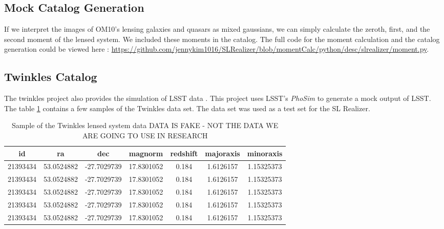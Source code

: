 \documentclass[\docopts]{\docclass}
\begin{document}
\subsection{Mock Catalog Generation}
\label{subsection:MCG}

If we interpret the images of OM10's lensing galaxies and quasars as mixed gaussians, we can simply calculate the zeroth, first, and the second moment of the lensed system. We included these moments in the catalog. The full code for the moment calculation and the catalog generation could be viewed here : \url{https://github.com/jennykim1016/SLRealizer/blob/momentCalc/python/desc/slrealizer/moment.py}.

\subsection{Twinkles Catalog}

The twinkles project also provides the simulation of LSST data \cite{Twinkles}. This project uses LSST's \textit{PhoSim} to generate a mock output of LSST. The table \ref{table:1} contains a few samples of the Twinkles data set. The data set was used as a test set for the SL Realizer.
 
\begin{table}[h!]
\centering
\begin{tabular}{||c c c c c c c||} 
 \hline
 id & ra & dec & magnorm & redshift & majoraxis & minoraxis   \\ [0.5ex] 
 \hline\hline
 21393434 & 53.0524882 & -27.7029739 & 17.8301052 & 0.184 & 1.6126157 & 1.15325373 \\ 
 21393434 & 53.0524882 & -27.7029739 & 17.8301052 & 0.184 & 1.6126157 & 1.15325373 \\
 21393434 & 53.0524882 & -27.7029739 & 17.8301052 & 0.184 & 1.6126157 & 1.15325373 \\
 21393434 & 53.0524882 & -27.7029739 & 17.8301052 & 0.184 & 1.6126157 & 1.15325373 \\
 21393434 & 53.0524882 & -27.7029739 & 17.8301052 & 0.184 & 1.6126157 & 1.15325373 \\ [1ex] 
 \hline
\end{tabular}
\caption{Sample of the Twinkles lensed system data \cite{Twinkles} DATA IS FAKE - NOT THE DATA WE ARE GOING TO USE IN RESEARCH}
\label{table:1}
\end{table}

\label{sec:catalog_generation}

\end{document}
